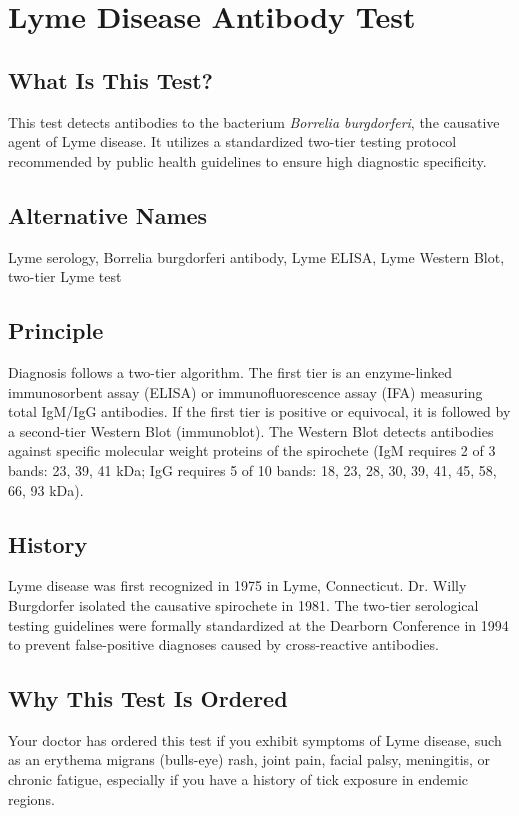 \chapter{Lyme Disease Antibody Test}

\section*{What Is This Test?}
This test detects antibodies to the bacterium \textit{Borrelia burgdorferi}, the causative agent of Lyme disease. It utilizes a standardized two-tier testing protocol recommended by public health guidelines to ensure high diagnostic specificity.

\section*{Alternative Names}
Lyme serology, Borrelia burgdorferi antibody, Lyme ELISA, Lyme Western Blot, two-tier Lyme test

\section*{Principle}
Diagnosis follows a two-tier algorithm. The first tier is an enzyme-linked immunosorbent assay (ELISA) or immunofluorescence assay (IFA) measuring total IgM/IgG antibodies. If the first tier is positive or equivocal, it is followed by a second-tier Western Blot (immunoblot). The Western Blot detects antibodies against specific molecular weight proteins of the spirochete (IgM requires 2 of 3 bands: 23, 39, 41 kDa; IgG requires 5 of 10 bands: 18, 23, 28, 30, 39, 41, 45, 58, 66, 93 kDa).

\section*{History}
Lyme disease was first recognized in 1975 in Lyme, Connecticut. Dr. Willy Burgdorfer isolated the causative spirochete in 1981. The two-tier serological testing guidelines were formally standardized at the Dearborn Conference in 1994 to prevent false-positive diagnoses caused by cross-reactive antibodies.

\section*{Why This Test Is Ordered}
Your doctor has ordered this test if you exhibit symptoms of Lyme disease, such as an erythema migrans (bulls-eye) rash, joint pain, facial palsy, meningitis, or chronic fatigue, especially if you have a history of tick exposure in endemic regions.

